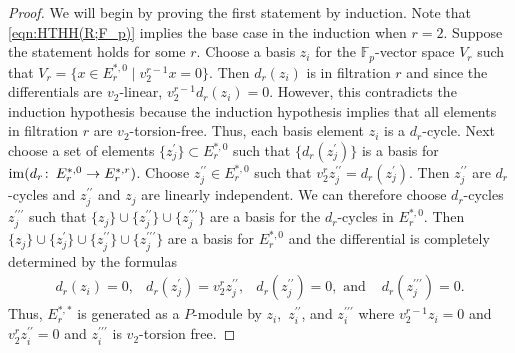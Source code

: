 \begin{proof}
We will begin by proving the first statement by induction. Note that \eqref{eqn:HTHH(R;F_p)} implies the base case in the induction when $r=2$. Suppose the statement holds for some $r$. Choose a basis $z_i$ for the $\mathbb{F}_p$-vector space $V_r$ such that $V_r=\{ x \in E_r^{*,0}\mid v_2^{r-1}x=0\}$. Then $d_r(z_i)$ is in filtration $r$ and since the differentials are $v_2$-linear, $v_2^{r-1}d_r(z_i)=0$. However, this contradicts the induction hypothesis because the induction hypothesis implies that all elements in filtration $r$ are $v_2$-torsion-free. Thus, each basis element $z_i$ is a $d_r$-cycle. Next choose a set of elements $\{z^{\prime}_j\}\subset E_r^{*,0}$ such that $\{d_r(z_j^{\prime})\}$ is a basis for $\operatorname{im}(d_r\colon \thinspace E_r^{*,0}\to E_r^{*,r})$. Choose $z^{\prime\prime}_j\in E_r^{*,0}$ such that $v_2^{r}z^{\prime\prime}_j=d_r(z_j^{\prime})$. Then $z^{\prime\prime}_j$ are $d_r$-cycles and $z^{\prime \prime}_j$ and $z_j$ are linearly independent. We can therefore choose $d_r$-cycles $z^{\prime \prime\prime}_j$ such that $\{z_j\}\cup\{z_j^{\prime\prime}\}\cup\{z_j^{\prime\prime\prime}\}$ are a basis for the $d_r$-cycles in $E_{r}^{*,0}$. Then 
$\{z_j\}\cup\{z_j^{\prime}\}\cup \{z_j^{\prime\prime}\}\cup\{z_j^{\prime\prime\prime}\}$
are a basis for $E_r^{*,0}$ and the differential is completely determined by the formulas
\[ \begin{array}{cccc} d_r(z_i)=0 , &d_r(z_j^{\prime})=v_2^{r}z_j^{\prime \prime}, & d_r(z_j^{\prime \prime})=0, \text{ and } & d_r(z_j^{\prime \prime \prime})=0. \end{array}\]
Thus, $E_r^{*,*}$ is generated as a $P$-module by $z_i,$ $z_i^{\prime \prime}$, and $z_i^{\prime \prime\prime}$ where $v_2^{r-1}z_i=0$ and $v_2^rz_i^{\prime \prime}=0$ and $z_i^{\prime \prime \prime}$ is $v_2$-torsion free. \end{proof}

